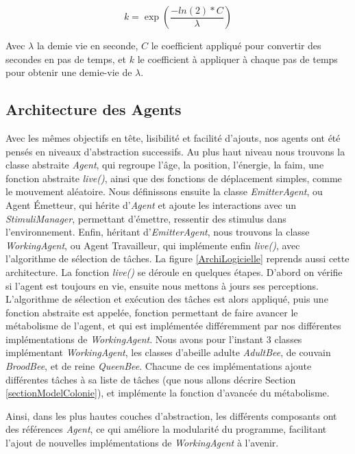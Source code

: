 			\begin{equation}
			k = \exp(\frac{-ln(2) * C}{\lambda})
			\end{equation}
			
			Avec $\lambda$ la demie vie en seconde, $C$ le coefficient appliqué pour convertir des secondes en pas de temps, et $k$ le coefficient à appliquer à chaque pas de temps pour obtenir une demie-vie de $\lambda$.
			
			\subsection{Architecture des Agents}
			Avec les mêmes objectifs en tête, lisibilité et facilité d'ajouts, nos agents ont été pensés en niveaux d'abstraction successifs. Au plus haut niveau nous trouvons la classe abstraite \textit{Agent}, qui regroupe l'âge, la position, l'énergie, la faim, une fonction abstraite \textit{live()}, ainsi que des fonctions de déplacement simples, comme le mouvement aléatoire. Nous définissons ensuite la classe \textit{EmitterAgent}, ou Agent Émetteur, qui hérite d'\textit{Agent} et ajoute les interactions avec un \textit{StimuliManager}, permettant d'émettre, ressentir des stimulus dans l'environnement. Enfin, héritant d'\textit{EmitterAgent}, nous trouvons la classe \textit{WorkingAgent}, ou Agent Travailleur, qui implémente enfin \textit{live()}, avec l'algorithme de sélection de tâches. La figure \ref{ArchiLogicielle} reprends aussi cette architecture. La fonction \textit{live()} se déroule en quelques étapes. D'abord on vérifie si l'agent est toujours en vie, ensuite nous mettons à jours ses perceptions. L'algorithme de sélection et exécution des tâches est alors appliqué, puis une fonction abstraite est appelée, fonction permettant de faire avancer le métabolisme de l'agent, et qui est implémentée différemment par nos différentes implémentations de \textit{WorkingAgent}. Nous avons pour l'instant 3 classes implémentant \textit{WorkingAgent}, les classes d'abeille adulte \textit{AdultBee}, de couvain \textit{BroodBee}, et de reine \textit{QueenBee}. Chacune de ces implémentations ajoute différentes tâches à sa liste de tâches (que nous allons décrire Section \ref{sectionModelColonie}), et implémente la fonction d'avancée du métabolisme.
			
			Ainsi, dans les plus hautes couches d'abstraction, les différents composants ont des références \textit{Agent}, ce qui améliore la modularité du programme, facilitant l'ajout de nouvelles implémentations de \textit{WorkingAgent} à l'avenir. 
			
